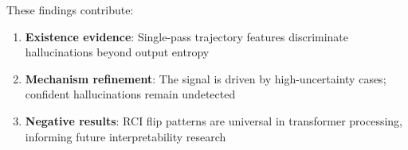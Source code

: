 These findings contribute:
\begin{enumerate}
    \item \textbf{Existence evidence}: Single-pass trajectory features discriminate hallucinations beyond output entropy
    \item \textbf{Mechanism refinement}: The signal is driven by high-uncertainty cases; confident hallucinations remain undetected
    \item \textbf{Negative results}: RCI flip patterns are universal in transformer processing, informing future interpretability research
\end{enumerate}
